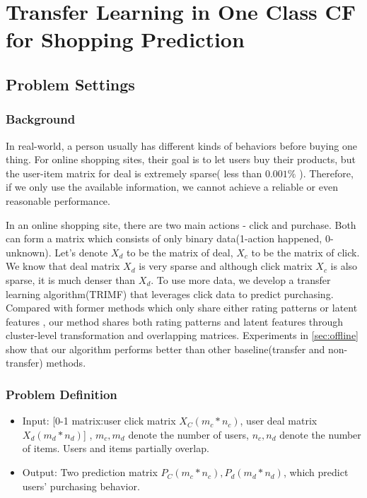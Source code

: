 \chapter{Transfer Learning in One Class CF for Shopping Prediction}
\label{chp:trimf}
\section{Problem Settings}
\subsection{Background}
\par{
In real-world, a person usually has different kinds of behaviors before buying one thing. For online shopping sites, their goal is to let users buy their products, but the user-item matrix for deal is extremely sparse( less than $0.001\%$ ). Therefore, if we only use the available information, we cannot achieve a reliable or even reasonable performance.

In an online shopping site, there are two main actions - click and purchase. Both can form a matrix which consists of only binary data(1-action happened, 0-unknown). Let's denote $X_d$ to be the matrix of deal, $X_c$ to be the matrix of click. We know that deal matrix $X_d$ is very sparse and although click matrix $X_c$ is also sparse, it is much denser than $X_d$. To use more data, we develop a transfer learning algorithm(TRIMF) that leverages click data to predict purchasing. Compared with former methods which only share either rating patterns or latent features , our method shares both rating patterns and latent features through cluster-level transformation and overlapping matrices. Experiments in \ref{sec:offline} show that our algorithm performs better than other baseline(transfer and non-transfer) methods.}

\subsection{Problem Definition}
  \begin{itemize}
  \item Input: [0-1 matrix:user click matrix $X_C(m_c*n_c)$, user deal matrix $X_d(m_d*n_d)$] , $m_c, m_d$ denote the number of users, $n_c, n_d$ denote the number of items. Users and items partially overlap.
  \item Output: Two prediction matrix $P_C(m_c*n_c), P_d(m_d*n_d)$, which predict users' purchasing behavior.
  \end{itemize}




